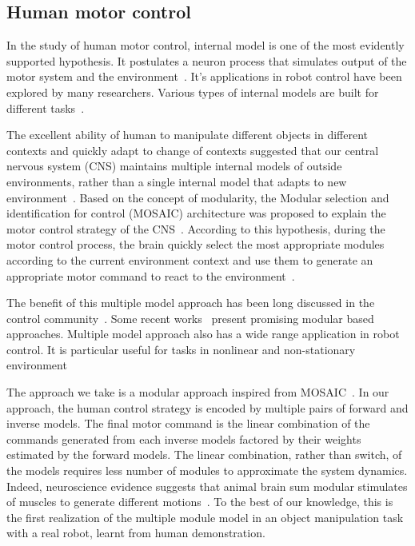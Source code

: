 \documentclass[preprint,12pt]{elsarticle}
\begin{document}

\subsection{Human motor control}

In the study of human motor control, internal model is one of the most evidently supported hypothesis. It postulates a neuron process that simulates output of the motor system and the environment~\cite{kawato1999internal}. It's applications in robot control have been explored by many researchers. Various types of internal models are built for different tasks~\cite{sciavicco2000modelling,jordan1992forward}.

The excellent ability of human to manipulate different objects in different contexts and quickly adapt to change of contexts suggested that our central nervous system (CNS) maintains multiple internal models of outside environments, rather than a single internal model that adapts to new environment~\cite{neilson1985acquisition}. Based on the concept of modularity, the Modular selection and identification for control (MOSAIC) architecture was proposed to explain the motor control strategy of the CNS~\cite{wolpert1998multiple}. According to this hypothesis, during the motor control process, the brain quickly select the most appropriate modules according to the current environment context and use them to generate an appropriate motor command to react to the environment~\cite{haruno2001mosaic}.

The benefit of this multiple model approach has been long discussed in the control community~\cite{jacobs1991adaptive,narendra1995adaptation,narendra1997adaptive}. Some recent works~\cite{fekri2007robust,kuipers2010multiple} present promising modular based approaches. Multiple model approach also has a wide range application in robot control. It is particular useful for tasks in nonlinear and non-stationary environment~\cite{petkos2006learning,sugimoto2012emosaic}



The approach we take is a modular approach inspired from MOSAIC~\cite{haruno2001mosaic}. In our approach, the human control strategy is encoded by multiple pairs of forward and inverse models. The final motor command is the linear combination of the commands generated from each inverse models factored by their weights estimated by the forward models. The linear combination, rather than switch, of the models requires less number of modules to approximate the system dynamics. Indeed, neuroscience evidence suggests that animal brain sum modular stimulates of muscles to generate different motions~\cite{mussa1994linear}. To the best of our knowledge, this is the first realization of the multiple module model in an object manipulation task with a real robot, learnt from human demonstration.
\end{document}
